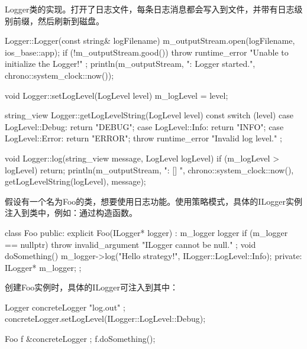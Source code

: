 Logger类的实现。打开了日志文件，每条日志消息都会写入到文件，并带有日志级别前缀，然后刷新到磁盘。

\begin{cpp}
Logger::Logger(const string& logFilename)
{
    m_outputStream.open(logFilename, ios_base::app);
    if (!m_outputStream.good()) {
        throw runtime_error { "Unable to initialize the Logger!" };
    }
    println(m_outputStream, "{}: Logger started.", chrono::system_clock::now());
}

void Logger::setLogLevel(LogLevel level)
{
    m_logLevel = level;
}

string_view Logger::getLogLevelString(LogLevel level) const
{
    switch (level) {
        case LogLevel::Debug: return "DEBUG";
        case LogLevel::Info: return "INFO";
        case LogLevel::Error: return "ERROR";
    }
    throw runtime_error { "Invalid log level." };
}

void Logger::log(string_view message, LogLevel logLevel)
{
    if (m_logLevel > logLevel) { return; }
    println(m_outputStream, "{}: [{}] {}", chrono::system_clock::now(),
        getLogLevelString(logLevel), message);
}
\end{cpp}


假设有一个名为Foo的类，想要使用日志功能。使用策略模式，具体的ILogger实例注入到类中，例如：通过构造函数。

\begin{cpp}
class Foo
{
    public:
        explicit Foo(ILogger* logger) : m_logger { logger }
        {
            if (m_logger == nullptr) {
                throw invalid_argument { "ILogger cannot be null." };
            }
        }
        void doSomething()
        {
            m_logger->log("Hello strategy!", ILogger::LogLevel::Info);
        }
    private:
        ILogger* m_logger;
};
\end{cpp}

创建Foo实例时，具体的ILogger可注入到其中：

\begin{cpp}
Logger concreteLogger { "log.out" };
concreteLogger.setLogLevel(ILogger::LogLevel::Debug);

Foo f { &concreteLogger };
f.doSomething();
\end{cpp}































